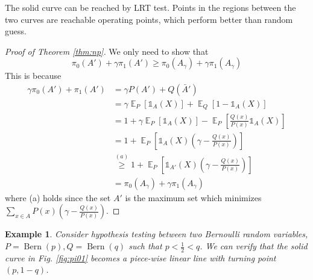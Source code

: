 \documentclass{article}
\DeclareMathOperator{\E}{\mathbb{E}}
\DeclareMathOperator{\Bern}{Bern}
\newtheorem{example}{Example}
\begin{document}
The solid curve can be reached by LRT test. Points in the 
regions between the two curves are reachable
operating points, which perform better than random guess.
\begin{proof}[Proof of Theorem \ref{thm:np}]
We only need to  show that
\begin{equation}
\pi_0(A') + \gamma \pi_1(A')
\geq \pi_0(A_{\gamma}) + \gamma \pi_1(A_{\gamma})
\end{equation}
This is because
\begin{align*}
    \gamma \pi_0(A') + \pi_1(A')
    &= \gamma P(A') +Q(\bar{A}') \\
    &= \gamma\E_P[\mathds{1}_A(X)]
    + \E_Q[1-\mathds{1}_A(X)] \\
    &=1+ \gamma \E_P[\mathds{1}_A(X)]
    - \E_P[\frac{Q(x)}{P(x)}\mathds{1}_A(X)] \\
    &=1 + \E_P[\mathds{1}_A(X)(\gamma - \frac{Q(x)}{P(x)})]\\
    &\stackrel{(a)}{\geq} 1 + \E_P[\mathds{1}_{A'}(X)(\gamma - \frac{Q(x)}{P(x)})]\\
    &=\pi_0(A_{\gamma}) + \gamma \pi_1(A_{\gamma})
\end{align*}
where (a) holds since the set $A'$ is the maximum
set which minimizes $\sum_{x\in A} P(x)(\gamma - \frac{Q(x)}{P(x)})$.
\end{proof}
\begin{example}\label{ex:1}
Consider hypothesis testing between two
Bernoulli random variables, $P=\Bern(p), Q=\Bern(q)$
such that $p<\frac{1}{2}<q$. We can verify that
the solid curve in Fig. \ref{fig:pi01} becomes
a piece-wise linear line with turning point $(p,1-q)$.
\end{example}
\end{document}
